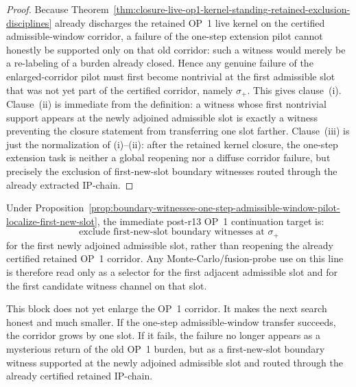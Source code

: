 \begin{proof}
Because Theorem~\ref{thm:closure-live-op1-kernel-standing-retained-exclusion-disciplines} already discharges the retained OP~1 live kernel on the certified admissible-window corridor, a failure of the one-step extension pilot cannot honestly be supported only on that old corridor: such a witness would merely be a re-labeling of a burden already closed. Hence any genuine failure of the enlarged-corridor pilot must first become nontrivial at the first admissible slot that was not yet part of the certified corridor, namely $\sigma_{+}$. This gives clause~(i). Clause~(ii) is immediate from the definition: a witness whose first nontrivial support appears at the newly adjoined admissible slot is exactly a witness preventing the closure statement from transferring one slot farther. Clause~(iii) is just the normalization of (i)--(ii): after the retained kernel closure, the one-step extension task is neither a global reopening nor a diffuse corridor failure, but precisely the exclusion of first-new-slot boundary witnesses routed through the already extracted IP-chain.
\end{proof}

\begin{corollary}
\label{cor:normalized-immediate-target-one-step-op1-extension-pilot}
Under Proposition~\ref{prop:boundary-witnesses-one-step-admissible-window-pilot-localize-first-new-slot}, the immediate post-r13 OP~1 continuation target is:
\[
\text{exclude first-new-slot boundary witnesses at } \sigma_{+}
\]
for the first newly adjoined admissible slot, rather than reopening the already certified retained OP~1 corridor. Any Monte-Carlo/fusion-probe use on this line is therefore read only as a selector for the first adjacent admissible slot and for the first candidate witness channel on that slot.
\end{corollary}

\begin{remark}
\label{rem:what-first-extension-boundary-localization-buys}
This block does not yet enlarge the OP~1 corridor. It makes the next search honest and much smaller. If the one-step admissible-window transfer succeeds, the corridor grows by one slot. If it fails, the failure no longer appears as a mysterious return of the old OP~1 burden, but as a first-new-slot boundary witness supported at the newly adjoined admissible slot and routed through the already certified retained IP-chain.
\end{remark}



